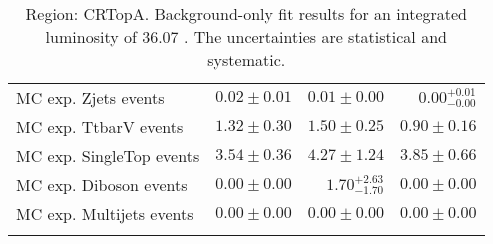\begin{table}
\begin{center}
{\begin{tabular*}{\textwidth}{@{\extracolsep{\fill}}lrrr}
        MC exp. Zjets events         & $0.02 \pm 0.01$          & $0.01 \pm 0.00$          & $0.00_{-0.00}^{+0.01}$              \\
        MC exp. TtbarV events         & $1.32 \pm 0.30$          & $1.50 \pm 0.25$          & $0.90 \pm 0.16$              \\
        MC exp. SingleTop events         & $3.54 \pm 0.36$          & $4.27 \pm 1.24$          & $3.85 \pm 0.66$              \\
        MC exp. Diboson events         & $0.00 \pm 0.00$          & $1.70_{-1.70}^{+2.63}$          & $0.00 \pm 0.00$              \\
        MC exp. Multijets events         & $0.00 \pm 0.00$          & $0.00 \pm 0.00$          & $0.00 \pm 0.00$              \\
\noalign{\smallskip}\hline\noalign{\smallskip}
\end{tabular*}
}
\end{center}
\caption{Region: CRTopA. Background-only fit results for an integrated luminosity of 36.07 \ifb. The uncertainties are statistical and systematic.
}
\label{table.bkgonly.CRTopA}
\end{table}
%